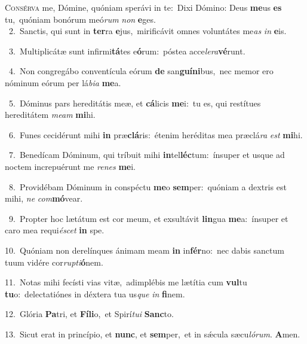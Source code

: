 \lettrine{\initial\textcolor{\initialcolor}{C}}{onsérva} me, Dómine, quóniam sperávi in te:~\dagger Dixi Dómino: Deus \textbf{me}\-us \textbf{es} tu,~\star quóniam bonórum meó\textit{rum} \textit{non} \textbf{e}\-ges.\\
{\numbfont\textcolor{\numbcolor}{~2.}}~Sanctis, qui sunt in \textbf{ter}\-ra \textbf{e}\-jus,~\star mirificávit omnes voluntátes me\textit{as} \textit{in} \textbf{e}\-is.\par
{\numbfont\textcolor{\numbcolor}{~3.}}~Multiplicátæ sunt infirmi\-\textbf{tá}\-tes e\-\textbf{ó}\-rum:~\star póstea acce\-\textit{le}\-\textit{ra}\textbf{vé}runt.\par
{\numbfont\textcolor{\numbcolor}{~4.}}~Non congregábo conventícula eórum \textbf{de} san\-\textbf{guí}\-\textbf{ni}bus,~\star nec memor ero nóminum eórum per lá\-\textit{bi}\-\textit{a} \textbf{me}\-a.\par
{\numbfont\textcolor{\numbcolor}{~5.}}~Dóminus pars hereditátis meæ, et \textbf{cá}\-licis \textbf{me}\-i:~\star tu es, qui restítues hereditátem \textit{me}\-\textit{am} \textbf{mi}\-hi.\par
{\numbfont\textcolor{\numbcolor}{~6.}}~Funes cecidérunt mihi \textbf{in} præ\-\textbf{clá}\-ris:~\star étenim heréditas mea præclá\textit{ra} \textit{est} \textbf{mi}\-hi.\par
{\numbfont\textcolor{\numbcolor}{~7.}}~Benedícam Dóminum, qui tríbuit mihi \textbf{in}\-tel\-\textbf{léc}\-tum:~\star ínsuper et usque ad noctem increpuérunt me \textit{re}\-\textit{nes} \textbf{me}\-i.\par
{\numbfont\textcolor{\numbcolor}{~8.}}~Providébam Dóminum in conspéctu \textbf{me}\-o \textbf{sem}\-per:~\star quóniam a dextris est mihi, \textit{ne} \textit{com}\-\textbf{mó}vear.\par
{\numbfont\textcolor{\numbcolor}{~9.}}~Propter hoc lætátum est cor meum, et exsultávit \textbf{lin}\-gua \textbf{me}\-a:~\star ínsuper et caro mea requi\-\textit{é}\-\textit{scet} \textbf{in} spe.\par
{\numbfont\textcolor{\numbcolor}{10.}}~Quóniam non derelínques ánimam meam \textbf{in} in\-\textbf{fér}\-no:~\star nec dabis sanctum tuum vidére cor\-\textit{rup}\-\textit{ti}\textbf{ó}nem.\par
{\numbfont\textcolor{\numbcolor}{11.}}~Notas mihi fecísti vias vitæ,~\dagger adimplébis me lætítia cum \textbf{vul}\-tu \textbf{tu}\-o:~\star delectatiónes in déxtera tua us\textit{que} \textit{in} \textbf{fi}\-nem.\par
{\numbfont\textcolor{\numbcolor}{12.}}~Glória \textbf{Pa}\-tri, et \textbf{Fí}\-\textbf{li}o,~\star et Spirí\-\textit{tu}\-\textit{i} \textbf{Sanc}\-to.\par
{\numbfont\textcolor{\numbcolor}{13.}}~Sicut erat in princípio, et \textbf{nunc}\-, et \textbf{sem}\-per,~\star et in sǽcula sæcu\-\textit{ló}\-\textit{rum}. \textbf{A}\-men.\par
